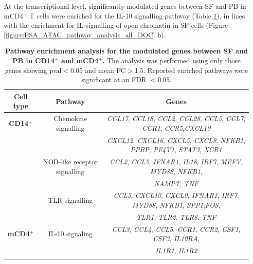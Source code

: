 At the transcriptional level, significantly modulated genes between SF and PB in mCD4$^+$ T cells were enriched for the IL-10 signalling pathway (Table \ref{table:PSA_PCR_array_pathway_analysis}), in lines with the enrichment for IL signalling of open chromatin in SF cells (Figure \ref{figure:PSA_ATAC_pathway_analysis_all_DOC} b). %


\begin{landscape}
\begin{center}
\begin{longtable}[ht]{c c c }
\caption[Pathway enrichment analysis for the modulated genes between SF and PB in CD14$^+$ and mCD4$^+$.]{\textbf{Pathway enrichment analysis for the modulated genes between SF and PB in CD14$^+$ and mCD4$^+$.} The analysis was performed using only those genes showing pval$<$0.05 and mean FC$>$1.5. Reported enriched pathways were significant at an FDR $<$0.05.}
\label{table:PSA_PCR_array_pathway_analysis} \\
\toprule
\textbf{Cell type} & \textbf{Pathway} & \textbf{Genes} \\						
\midrule
\midrule
\textbf{CD14$^+$} & Chemokine signalling & \textit{CCL17}, \textit{CCL18}, \textit{CCL2}, \textit{CCL28}, \textit{CCL5}, \textit{CCL7}, \textit{CCR1}, \textit{CCR5},\textit{CXCL10} \\  
									&                             & \textit{CXCL12}, \textit{CXCL16}, \textit{CXCL5}, \textit{CXCL9}, \textit{NFKB1}, \textit{PPBP}, \textit{PF4V1}, \textit{STAT3}, \textit{XCR1}\\
									
									& NOD-like receptor signalling & \textit{CCL2}, \textit{CCL5}, \textit{IFNAR1}, \textit{IL18}, \textit{IRF7}, \textit{MEFV}, \textit{MYD88}, \textit{NFKB1}, \\
									&                                         & \textit{NAMPT}, \textit{TNF} \\

									& TLR signalling   & \textit{CCL5}, \textit{CXCL10}, \textit{CXCL9}, \textit{IFNAR1}, \textit{IRF7}, \textit{MYD88}, \textit{NFKB1}, \textit{SPP1},\textit{FOS},\\ 
									&                                         & \textit{TLR1}, \textit{TLR2}, \textit{TLR8}, \textit{TNF}\\

\midrule
\textbf{mCD4$^+$} & IL-10 signaling & \textit{CCL3}, \textit{CCL4}, \textit{CCL5}, \textit{CCR1}, \textit{CCR2}, \textit{CSF1}, \textit{CSF3}, \textit{IL10RA}, \\
									&									& \textit{IL1R1}, \textit{IL1R2}\\
\bottomrule
\medskip
\end{longtable}
\end{center}
\end{landscape}

